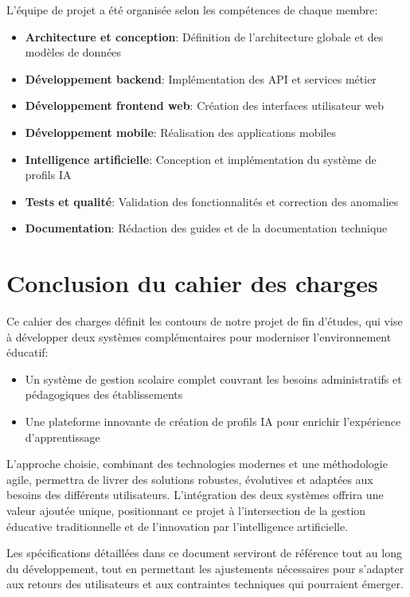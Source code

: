 L'équipe de projet a été organisée selon les compétences de chaque membre:

\begin{itemize}
  \item \textbf{Architecture et conception}: Définition de l'architecture globale et des modèles de données
  
  \item \textbf{Développement backend}: Implémentation des API et services métier
  
  \item \textbf{Développement frontend web}: Création des interfaces utilisateur web
  
  \item \textbf{Développement mobile}: Réalisation des applications mobiles
  
  \item \textbf{Intelligence artificielle}: Conception et implémentation du système de profils IA
  
  \item \textbf{Tests et qualité}: Validation des fonctionnalités et correction des anomalies
  
  \item \textbf{Documentation}: Rédaction des guides et de la documentation technique
\end{itemize}

\section{Conclusion du cahier des charges}

Ce cahier des charges définit les contours de notre projet de fin d'études, qui vise à développer deux systèmes complémentaires pour moderniser l'environnement éducatif:

\begin{itemize}
  \item Un système de gestion scolaire complet couvrant les besoins administratifs et pédagogiques des établissements
  
  \item Une plateforme innovante de création de profils IA pour enrichir l'expérience d'apprentissage
\end{itemize}

L'approche choisie, combinant des technologies modernes et une méthodologie agile, permettra de livrer des solutions robustes, évolutives et adaptées aux besoins des différents utilisateurs. L'intégration des deux systèmes offrira une valeur ajoutée unique, positionnant ce projet à l'intersection de la gestion éducative traditionnelle et de l'innovation par l'intelligence artificielle.

Les spécifications détaillées dans ce document serviront de référence tout au long du développement, tout en permettant les ajustements nécessaires pour s'adapter aux retours des utilisateurs et aux contraintes techniques qui pourraient émerger. 